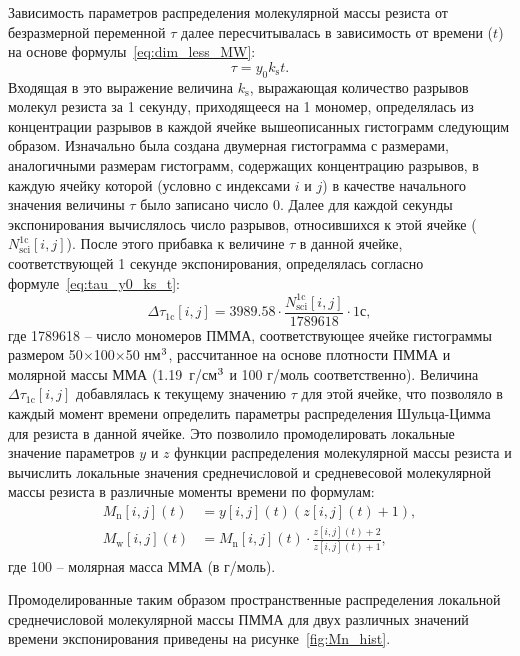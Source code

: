 Зависимость параметров распределения молекулярной массы резиста от безразмерной переменной $\tau$ далее пересчитывалась в зависимость от времени ($t$) на основе формулы~\ref{eq:dim_less_MW}:
\begin{equation} \label{eq:tau_y0_ks_t}
	\tau = y_0 k_\mathrm{s} t.
\end{equation}
Входящая в это выражение величина $k_\mathrm{s}$, выражающая количество разрывов молекул резиста за 1 секунду, приходящееся на 1 мономер, определялась из концентрации разрывов в каждой ячейке вышеописанных гистограмм следующим образом. Изначально была создана двумерная гистограмма с размерами, аналогичными размерам гистограмм, содержащих концентрацию разрывов, в каждую ячейку которой (условно с индексами $i$ и $j$) в качестве начального значения величины $\tau$ было записано число 0. Далее для каждой секунды экспонирования вычислялось число разрывов, относившихся к этой ячейке ($N_\mathrm{sci}^\mathrm{1c}[i,j]$). После этого прибавка к величине $\tau$ в данной ячейке, соответствующей 1 секунде экспонирования, определялась согласно формуле~\ref{eq:tau_y0_ks_t}:
\begin{equation}
	\Delta \tau_\mathrm{1c} [i,j] = 3989.58 \cdot \frac{N_\mathrm{sci}^\mathrm{1c}[i,j]}{1789618} \cdot 1с,
\end{equation}
где 1789618 -- число мономеров ПММА, соответствующее ячейке гистограммы размером 50$\times$100$\times$50 нм$^\text{3}$, рассчитанное на основе плотности ПММА и молярной массы ММА (1.19~г/см$^\text{3}$ и 100 г/моль соответственно). Величина $\Delta \tau_\mathrm{1c} [i,j]$ добавлялась к текущему значению $\tau$ для этой ячейке, что позволяло в каждый момент времени определить параметры распределения Шульца-Цимма для резиста в данной ячейке. Это позволило промоделировать локальные значение параметров $y$ и $z$ функции распределения молекулярной массы резиста и вычислить локальные значения среднечисловой и средневесовой молекулярной массы резиста в различные моменты времени по формулам:
\begin{equation}
	\begin{aligned}
	M_\mathrm{n} [i,j] (t) & = y[i,j] (t) (z [i,j] (t) + 1), \\
	M_\mathrm{w} [i,j] (t) & = M_\mathrm{n} [i,j] (t) \cdot \frac{z[i,j] (t) + 2}{z[i,j] (t) + 1},
	\end{aligned}
\end{equation}
где 100 -- молярная масса ММА (в г/моль).

Промоделированные таким образом пространственные распределения локальной среднечисловой молекулярной массы ПММА для двух различных значений времени экспонирования приведены на рисунке~\ref{fig:Mn_hist}.

